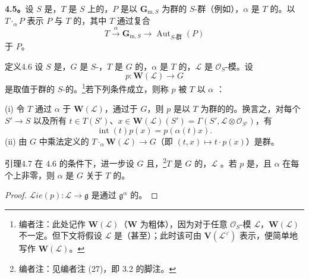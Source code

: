 \textbf{4.5。}设 $S$ 是，$T$ 是 $S$ 上的，$P$ 是以 $\mathbf G_{\mathrm m,S}$ 为群的 $S$-群（例如），$\alpha$ 是 $T$ 的。以 $T\cdot_\alpha P$ 表示 $P$ 与 $T$ 的，其中 $T$ 通过复合
\[
T\xrightarrow{\alpha}\mathbf G_{\mathrm m,S}\longrightarrow\operatorname{Aut}_{S\text{-群}}(P)
\]
于 $P$。
\begin{SGAresult}{定义}{4.6}
设 $S$ 是，$G$ 是 $S$-，$T$ 是 $G$ 的，$\alpha$ 是 $T$ 的，$\mathscr L$ 是 $\mathscr O_S$-模。设
\[
p:\mathbf W(\mathscr L)\longrightarrow G
\]
是取值于群的 $S$-的。\footnote[34]{编者注：此处记作 $\mathbf W(\mathscr L)$（$\mathbf W$ 为粗体），因为对于任意 $\mathscr O_S$-模 $\mathscr L$，$\mathbf W(\mathscr L)$ 不一定。但下文将假设 $\mathscr L$ 是（甚至）；此时该可由 $\mathbf V(\mathscr L^\vee)$ 表示，便简单地写作 $\mathbf W(\mathscr L)$。}若下列条件成立，则称 $p$ 被 $T$ 以 $\alpha$ ：

(i) 令 $T$ 通过 $\alpha$ 于 $\mathbf W(\mathscr L)$，通过于 $G$，则 $p$ 是以 $T$ 为群的的。换言之，对每个 $S'\to S$ 以及所有 $t\in T(S')$、$x\in\mathbf W(\mathscr L)(S')=\Gamma(S',\mathscr L\otimes\mathscr O_{S'})$，有
\[
\operatorname{int}(t)p(x)=p(\alpha(t)x).
\]
(ii) 由 $G$ 中乘法定义的 $T\cdot_\alpha\mathbf W(\mathscr L)\to G$（即 $(t,x)\mapsto t\cdot p(x)$）是群。
\end{SGAresult}
\begin{SGAresult}{引理}{4.7}
在 4.6 的条件下，进一步设 $G$ 且，\footnote[35]{编者注：见编者注 (27)，即 3.2 的脚注。}$T$ 是 $G$ 的，$\mathscr L$ 。若 $p$ 是，且 $\alpha$ 在每个上非零，则 $\alpha$ 是 $G$ 关于 $T$ 的。
\end{SGAresult}
\begin{proof}
$\mathscr{L}\!ie(p):\mathscr L\to\mathfrak g$ 是通过 $\mathfrak g^\alpha$ 的。
\end{proof}
